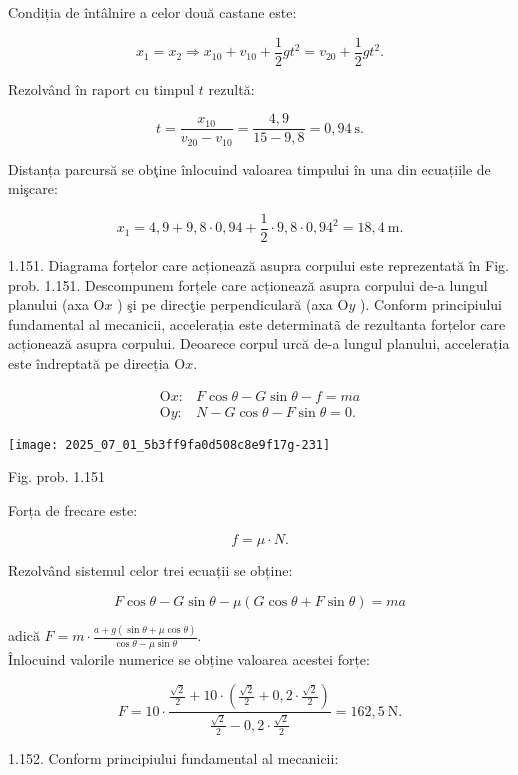 Condiția de întâlnire a celor două castane este:

$$
x_{1}=x_{2} \Rightarrow x_{10}+v_{10}+\frac{1}{2} g t^{2}=v_{20}+\frac{1}{2} g t^{2} .
$$

Rezolvând în raport cu timpul $t$ rezultă:

$$
t=\frac{x_{10}}{v_{20}-v_{10}}=\frac{4,9}{15-9,8}=0,94 \mathrm{~s} .
$$

Distanța parcursă se obţine înlocuind valoarea timpului în una din ecuațiile de mişcare:

$$
x_{1}=4,9+9,8 \cdot 0,94+\frac{1}{2} \cdot 9,8 \cdot 0,94^{2}=18,4 \mathrm{~m} .
$$

1.151. Diagrama forțelor care acționează asupra corpului este reprezentată în Fig. prob. 1.151. Descompunem forțele care acționează asupra corpului de-a lungul planului (axa $\mathrm{O} x$ ) şi pe direcţie perpendiculară (axa $\mathrm{O} y$ ). Conform principiului fundamental al mecanicii, accelerația este determinatã de rezultanta forțelor care acționează asupra corpului. Deoarece corpul urcă de-a lungul planului, accelerația este îndreptată pe direcția $\mathrm{O} x$.

$$
\begin{array}{ll}
\mathrm{O} x: & F \cos \theta-G \sin \theta-f=m a \\
\mathrm{O} y: & N-G \cos \theta-F \sin \theta=0 .
\end{array}
$$

\begin{center}
\texttt{[image: 2025\_07\_01\_5b3ff9fa0d508c8e9f17g-231]}
\end{center}

Fig. prob. 1.151

Forța de frecare este:

$$
f=\mu \cdot N .
$$

Rezolvând sistemul celor trei ecuații se obține:

$$
F \cos \theta-G \sin \theta-\mu(G \cos \theta+F \sin \theta)=m a
$$

adică $F=m \cdot \frac{a+g(\sin \theta+\mu \cos \theta)}{\cos \theta-\mu \sin \theta}$.\\
Înlocuind valorile numerice se obține valoarea acestei forțe:

$$
F=10 \cdot \frac{\frac{\sqrt{2}}{2}+10 \cdot\left(\frac{\sqrt{2}}{2}+0,2 \cdot \frac{\sqrt{2}}{2}\right)}{\frac{\sqrt{2}}{2}-0,2 \cdot \frac{\sqrt{2}}{2}}=162,5 \mathrm{~N} .
$$

1.152. Conform principiului fundamental al mecanicii:


